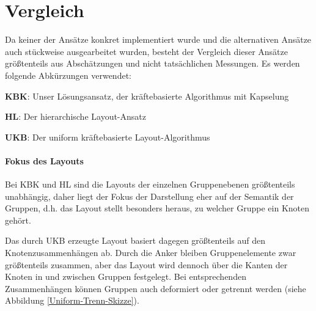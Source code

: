 \section{Vergleich}
\label{Ansatz-Vergleich}
Da keiner der Ansätze konkret implementiert wurde und die alternativen Ansätze auch stückweise ausgearbeitet wurden, besteht der Vergleich dieser Ansätze größtenteils aus Abschätzungen und nicht tatsächlichen Messungen. Es werden folgende Abkürzungen verwendet:

\textbf{KBK}: Unser Lösungsansatz, der kräftebasierte Algorithmus mit Kapselung

\textbf{HL}: Der hierarchische Layout-Ansatz

\textbf{UKB}: Der uniform kräftebasierte Layout-Algorithmus

\paragraph*{Fokus des Layouts}
Bei KBK und HL sind die Layouts der einzelnen Gruppenebenen größtenteils unabhängig, daher liegt der Fokus der Darstellung eher auf der Semantik der Gruppen, d.h. das Layout stellt besonders heraus, zu welcher Gruppe ein Knoten gehört.

Das durch UKB erzeugte Layout basiert dagegen größtenteils auf den Knotenzusammenhängen ab. Durch die Anker bleiben Gruppenelemente zwar größtenteils zusammen, aber das Layout wird dennoch über die Kanten der Knoten in und zwischen Gruppen festgelegt. Bei entsprechenden Zusammenhängen können Gruppen auch deformiert oder getrennt werden (siehe Abbildung \ref{Uniform-Trenn-Skizze}).

